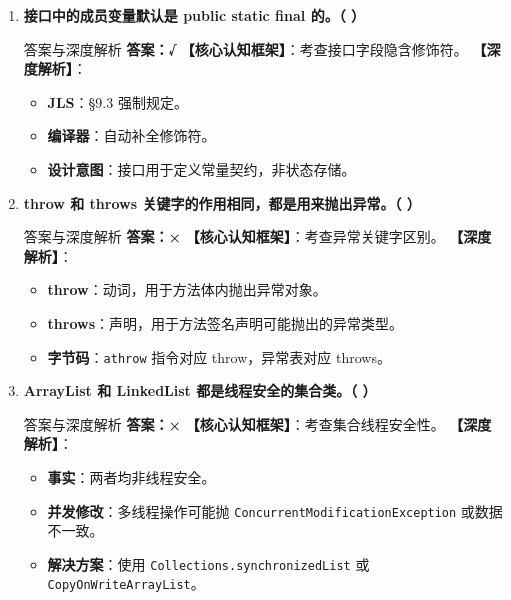 \documentclass[12pt, a4paper]{ctexart}
\newcommand{\code}[1]{\texttt{\color{myblue}#1}}
\begin{document}
\begin{enumerate}[label=\arabic*.]
	\item \textbf{接口中的成员变量默认是 public static final 的。（ \quad ）}
	      \begin{bluebox}{答案与深度解析}
		      \textbf{答案：√}
		      \textbf{【核心认知框架】}：考查接口字段隐含修饰符。
		      \textbf{【深度解析】}：
		      \begin{itemize}[leftmargin=*, nosep]
			      \item \textbf{JLS}：§9.3 强制规定。
			      \item \textbf{编译器}：自动补全修饰符。
			      \item \textbf{设计意图}：接口用于定义常量契约，非状态存储。
		      \end{itemize}
	      \end{bluebox}

	\item \textbf{throw 和 throws 关键字的作用相同，都是用来抛出异常。（ \quad ）}
	      \begin{bluebox}{答案与深度解析}
		      \textbf{答案：×}
		      \textbf{【核心认知框架】}：考查异常关键字区别。
		      \textbf{【深度解析】}：
		      \begin{itemize}[leftmargin=*, nosep]
			      \item \textbf{throw}：动词，用于方法体内抛出异常对象。
			      \item \textbf{throws}：声明，用于方法签名声明可能抛出的异常类型。
			      \item \textbf{字节码}：\code{athrow} 指令对应 throw，异常表对应 throws。
		      \end{itemize}
	      \end{bluebox}

	\item \textbf{ArrayList 和 LinkedList 都是线程安全的集合类。（ \quad ）}
	      \begin{bluebox}{答案与深度解析}
		      \textbf{答案：×}
		      \textbf{【核心认知框架】}：考查集合线程安全性。
		      \textbf{【深度解析】}：
		      \begin{itemize}[leftmargin=*, nosep]
			      \item \textbf{事实}：两者均非线程安全。
			      \item \textbf{并发修改}：多线程操作可能抛 \code{ConcurrentModificationException} 或数据不一致。
			      \item \textbf{解决方案}：使用 \code{Collections.synchronizedList} 或 \code{CopyOnWriteArrayList}。
		      \end{itemize}
	      \end{bluebox}


\end{enumerate}
\end{document}
